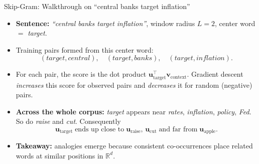 \begin{frame}{Skip-Gram: Walkthrough on ``central banks target inflation''}
\begin{itemize}
\item \textbf{Sentence:} \emph{``central banks target inflation''}, window radius $L = 2$, center word $=$ \emph{target}.

\medskip
\item Training pairs formed from this center word:
\[
(\textit{target}, \textit{central}), \quad (\textit{target}, \textit{banks}), \quad (\textit{target}, \textit{inflation}).
\]

\medskip
\item For each pair, the score is the dot product $\mathbf{u}_{\text{target}}^{\top} \mathbf{v}_{\text{context}}$. Gradient descent \emph{increases} this score for observed pairs and \emph{decreases} it for random (negative) pairs.

\medskip
\item \textbf{Across the whole corpus:} \emph{target} appears near \emph{rates}, \emph{inflation}, \emph{policy}, \emph{Fed}. So do \emph{raise} and \emph{cut}. Consequently
\[
\mathbf{u}_{\text{target}} \;\text{ends up close to}\; \mathbf{u}_{\text{raise}},\, \mathbf{u}_{\text{cut}} \;\text{and far from}\; \mathbf{u}_{\text{apple}}.
\]

\medskip
\item \textbf{Takeaway:} analogies emerge because consistent co-occurrences place related words at similar positions in $\mathbb{R}^{d}$.
\end{itemize}
\end{frame}

